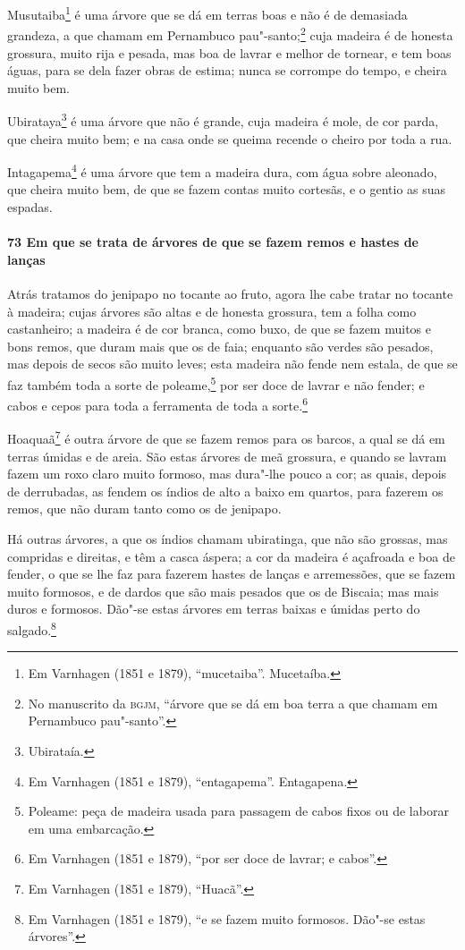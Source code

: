 \begin{linenumbers}
Musutaiba\footnote{ Em Varnhagen (1851 e 1879), ``mucetaiba''. Mucetaíba.} é uma árvore
que se dá em terras boas e não é de demasiada grandeza, a que chamam em Pernambuco
pau"-santo;\footnote{ No manuscrito da \textsc{bgjm}, ``árvore que se dá em boa terra a que
chamam em Pernambuco pau"-santo''.} cuja madeira é de honesta grossura, muito rija e
pesada, mas boa de lavrar e melhor de tornear, e tem boas águas, para se dela fazer obras
de estima; nunca se corrompe do tempo, e cheira muito bem.

Ubirataya\footnote{ Ubirataía.} é uma árvore que não é grande, cuja madeira é mole, de cor
parda, que cheira muito bem; e na casa onde se queima recende o cheiro por toda a rua.

Intagapema\footnote{ Em Varnhagen (1851 e 1879), ``entagapema''. Entagapena.} é uma árvore
que tem a madeira dura, com água sobre aleonado, que cheira muito bem, de que se fazem
contas muito cortesãs, e o gentio as suas espadas.

\paragraph{73 Em que se trata de árvores de que se fazem remos e hastes de lanças}\quad
Atrás tratamos do jenipapo no tocante ao fruto, agora lhe cabe tratar no tocante à
madeira; cujas árvores são altas e de honesta grossura, tem a folha como castanheiro; a
madeira é de cor branca, como buxo, de que se fazem muitos e bons remos, que duram mais
que os de faia; enquanto são verdes são pesados, mas depois de secos são muito leves; esta
madeira não fende nem estala, de que se faz também toda a sorte de poleame,\footnote{
Poleame: peça de madeira usada para passagem de cabos fixos ou de laborar em uma
embarcação.} por ser doce de lavrar e não fender; e cabos e cepos para toda a ferramenta
de toda a sorte.\footnote{ Em Varnhagen (1851 e 1879), ``por ser doce de lavrar; e
cabos''.}

Hoaquaã\footnote{ Em Varnhagen (1851 e 1879), ``Huacã''.} é outra árvore de que se fazem
remos para os barcos, a qual se dá em terras úmidas e de areia. São estas árvores de meã
grossura, e quando se lavram fazem um roxo claro muito formoso, mas dura"-lhe pouco a cor;
as quais, depois de derrubadas, as fendem os índios de alto a baixo em quartos, para
fazerem os remos, que não duram tanto como os de jenipapo.

Há outras árvores, a que os índios chamam ubiratinga, que não são grossas, mas compridas e
direitas, e têm a casca áspera; a cor da madeira é açafroada e boa de fender, o que se lhe
faz para fazerem hastes de lanças e arremessões, que se fazem muito formosos, e de dardos
que são mais pesados que os de Biscaia; mas mais duros e formosos. Dão"-se estas árvores em
terras baixas e úmidas perto do salgado.\footnote{ Em Varnhagen (1851 e 1879), ``e se
fazem muito formosos. Dão"-se estas árvores''.}


\end{linenumbers}

